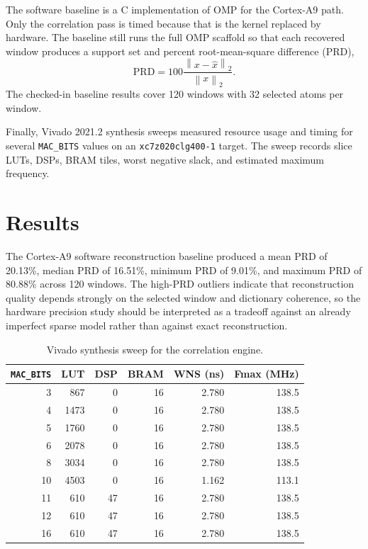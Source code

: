 \documentclass[onecolumn,conference]{IEEEtran}
\begin{document}
The software baseline is a C implementation of OMP for the Cortex-A9 path. Only the correlation pass is timed because that is the kernel replaced by hardware. The baseline still runs the full OMP scaffold so that each recovered window produces a support set and percent root-mean-square difference (PRD),
\begin{equation}
    \mathrm{PRD}=100\frac{\left\|x-\hat{x}\right\|_2}{\left\|x\right\|_2}.
\end{equation}
The checked-in baseline results cover 120 windows with 32 selected atoms per window.

Finally, Vivado 2021.2 synthesis sweeps measured resource usage and timing for several \texttt{MAC\_BITS} values on an \texttt{xc7z020clg400-1} target. The sweep records slice LUTs, DSPs, BRAM tiles, worst negative slack, and estimated maximum frequency.

\section{Results}
The Cortex-A9 software reconstruction baseline produced a mean PRD of 20.13\%, median PRD of 16.51\%, minimum PRD of 9.01\%, and maximum PRD of 80.88\% across 120 windows. The high-PRD outliers indicate that reconstruction quality depends strongly on the selected window and dictionary coherence, so the hardware precision study should be interpreted as a tradeoff against an already imperfect sparse model rather than against exact reconstruction.

\begin{table}[t]
\centering
\caption{Vivado synthesis sweep for the correlation engine.}
\label{tab:sweep}
\begin{tabular}{rrrrrr}
\toprule
\texttt{MAC\_BITS} & LUT & DSP & BRAM & WNS (ns) & Fmax (MHz) \\
\midrule
3  & 867  & 0  & 16 & 2.780 & 138.5 \\
4  & 1473 & 0  & 16 & 2.780 & 138.5 \\
5  & 1760 & 0  & 16 & 2.780 & 138.5 \\
6  & 2078 & 0  & 16 & 2.780 & 138.5 \\
8  & 3034 & 0  & 16 & 2.780 & 138.5 \\
10 & 4503 & 0  & 16 & 1.162 & 113.1 \\
11 & 610  & 47 & 16 & 2.780 & 138.5 \\
12 & 610  & 47 & 16 & 2.780 & 138.5 \\
16 & 610  & 47 & 16 & 2.780 & 138.5 \\
\bottomrule
\end{tabular}
\end{table}
\end{document}

